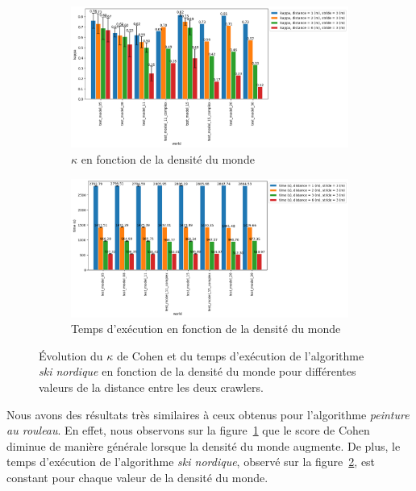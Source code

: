 \documentclass[francais,RandD]{rapportPFE}
\begin{document}
			\begin{figure}[h!]
				\centering
				\begin{subfigure}[t]{0.9\linewidth}
					\includegraphics[width=\linewidth]{graphics/ski_nordique-kappa_vs_world_for_each_d.png}
					\caption{$\kappa$ en fonction de la densité du monde}
					\label{fig:ski_nordique-kappa_vs_world_d}
				\end{subfigure}
				\hfill
				\begin{subfigure}[t]{0.9\linewidth}
						\includegraphics[width=\linewidth]{graphics/ski_nordique-time_vs_world_for_each_d.png}
						\caption{Temps d'exécution en fonction de la densité du monde}
						\label{fig:ski_nordique-time_vs_world_d}
				\end{subfigure}
				\caption{Évolution du $\kappa$ de Cohen et du temps d'exécution de l'algorithme \textit{ski nordique} en fonction de la densité du monde pour différentes valeurs de la distance entre les deux crawlers.}
				\label{fig:ski_nordique-world_d}
			\end{figure}

			Nous avons des résultats très similaires à ceux obtenus pour l'algorithme \textit{peinture au rouleau}.
			En effet, nous observons sur la figure~\ref{fig:ski_nordique-kappa_vs_world_d} que le score de Cohen diminue de manière générale lorsque la densité du monde augmente.
			De plus, le temps d'exécution de l'algorithme \textit{ski nordique}, observé sur la figure~\ref{fig:ski_nordique-time_vs_world_d}, est constant pour chaque valeur de la densité du monde.
\end{document}
